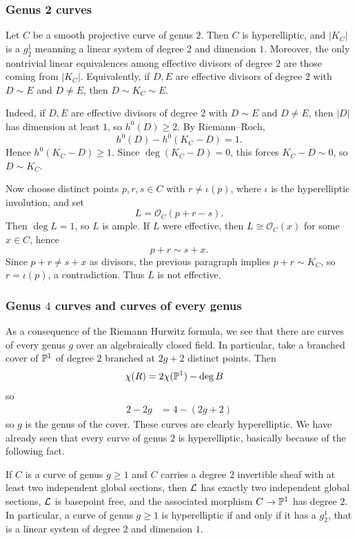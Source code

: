 \documentclass[12pt]{article}
\begin{document}
\subsubsection{Genus 2 curves}

Let \(C\) be a smooth projective curve of genus \(2\). Then \(C\) is hyperelliptic, and \(|K_C|\) is a \(g^1_2\) meanning a linear system of degree \(2\) and dimension \(1\).  Moreover, the only nontrivial linear equivalences among effective divisors of degree \(2\) are those coming from \(|K_C|\). Equivalently, if \(D,E\) are effective divisors of degree \(2\) with \(D\sim E\) and \(D\neq E\), then \(D\sim K_C\sim E\).

Indeed, if \(D,E\) are effective divisors of degree \(2\) with \(D\sim E\) and \(D\neq E\), then \(|D|\) has dimension at least \(1\), so \(h^0(D)\ge 2\). By Riemann--Roch,
\[
    h^0(D)-h^0(K_C-D)=1.
\]
Hence \(h^0(K_C-D)\ge 1\). Since \(\deg(K_C-D)=0\), this forces \(K_C-D\sim 0\), so \(D\sim K_C\).

Now choose distinct points \(p,r,s\in C\) with \(r\neq \iota(p)\), where \(\iota\) is the hyperelliptic involution, and set
\[
    L=\mathcal O_C(p+r-s).
\]
Then \(\deg L=1\), so \(L\) is ample. If \(L\) were effective, then \(L\cong \mathcal O_C(x)\) for some \(x\in C\), hence
\[
    p+r\sim s+x.
\]
Since \(p+r\neq s+x\) as divisors, the previous paragraph implies \(p+r\sim K_C\), so \(r=\iota(p)\), a contradiction. Thus \(L\) is not effective.

\subsubsection{Genus $4$ curves and curves of every genus}
As a consequence of the Riemann Hurwitz formula, we see that there are curves of every genus $g$ over an algebraically closed field. In particular, take a branched cover of $\P^1$ of degree $2$ branched at $2g+2$ distinct points. Then \begin{align*}
    \chi(R) & = 2\chi(\P^1) - \deg B 
\end{align*} so \begin{align*}
    2-2g & = 4 - (2g+2)
\end{align*} so $g$ is the genus of the cover. These curves are clearly hyperelliptic. We have already seen that every curve of genus $2$ is hyperelliptic, basically because of the following fact.

\begin{proposition}
    If $C$ is a curve of genus $g \geq 1$ and $C$ carries a degree $2$ invertible sheaf with at least two independent global sections, then $\cL$ has exactly two independent global sections, $\cL$ is basepoint free, and the associated morphism $C \to \P^1$ has degree $2$. In particular, a curve of genus $g \geq 1$ is hyperelliptic if and only if it has a $g^1_2$, that is a linear system of degree $2$ and dimension $1$.
\end{proposition}
\end{document}
